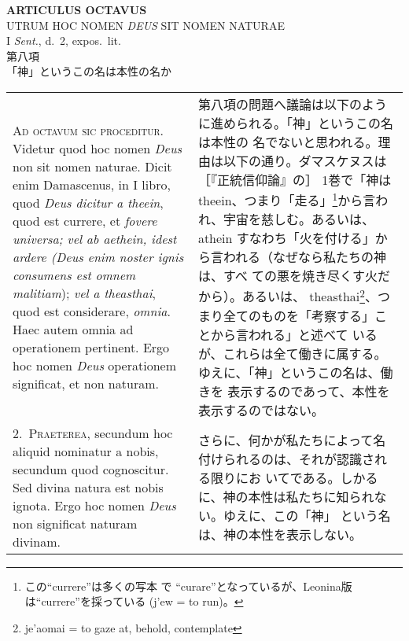 \documentclass[paper=a4paper,fontsize=10pt,jafontsize=9pt,titlepage]{jlreq}
\begin{document}
\begin{center}
{\Large {\bfseries ARTICULUS OCTAVUS}}\\
{\large UTRUM HOC NOMEN {\itshape DEUS} SIT NOMEN NATURAE}\\
{\footnotesize I {\itshape Sent.}, d.~2, expos.~lit.}\\
{\Large 第八項\\「神」というこの名は本性の名か}
\end{center}

\begin{longtable}{p{21em}p{21em}}

{\huge A}{\scshape d octavum sic proceditur}. Videtur quod hoc nomen
{\itshape Deus} non sit nomen naturae. Dicit enim Damascenus, in I
libro, quod {\itshape Deus dicitur a theein}, quod est currere, et
{\itshape fovere universa; vel ab aethein, idest ardere (Deus enim
noster ignis consumens est omnem malitiam}); {\itshape vel a
theasthai}, quod est considerare, {\itshape omnia}. Haec autem omnia
ad operationem pertinent. Ergo hoc nomen {\itshape Deus} operationem
significat, et non naturam.

&

第八項の問題へ議論は以下のように進められる。「神」というこの名は本性の
名でないと思われる。理由は以下の通り。ダマスケヌスは［『正統信仰論』の］
1巻で「神はtheein、つまり「走る」\footnote{この``currere''は多くの写本
で ``curare''となっているが、Leonina版は``currere''を採っている
(\textgreek{j'ew} = to run)。}から言われ、宇宙を慈しむ。あるいは、
athein すなわち「火を付ける」から言われる（なぜなら私たちの神は、すべ
ての悪を焼き尽くす火だから）。あるいは、
theasthai\footnote{\textgreek{je'aomai} = to gaze at, behold,
contemplate}、つまり全てのものを「考察する」ことから言われる」と述べて
いるが、これらは全て働きに属する。ゆえに、「神」というこの名は、働きを
表示するのであって、本性を表示するのではない。

\\

2.~{\scshape Praeterea}, secundum hoc aliquid nominatur a nobis,
secundum quod cognoscitur. Sed divina natura est nobis ignota. Ergo
hoc nomen {\itshape Deus} non significat naturam divinam.

&

さらに、何かが私たちによって名付けられるのは、それが認識される限りにお
いてである。しかるに、神の本性は私たちに知られない。ゆえに、この「神」
という名は、神の本性を表示しない。

\\


\end{longtable}
\end{document}
